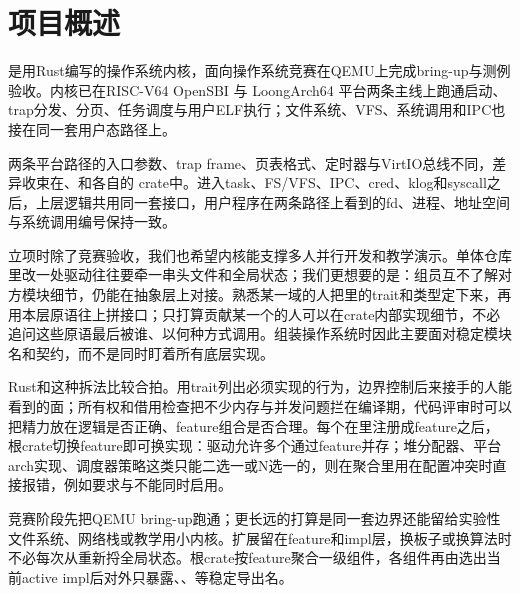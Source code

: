 %
%

\chapter{项目概述}

\wateros{}是用Rust编写的操作系统内核，面向操作系统竞赛在QEMU上完成bring-up与测例验收。内核已在RISC-V64 OpenSBI 与 LoongArch64  平台两条主线上跑通启动、trap分发、分页、任务调度与用户ELF执行；文件系统、VFS、系统调用和IPC也接在同一套用户态路径上。

两条平台路径的入口参数、trap frame、页表格式、定时器与VirtIO总线不同，差异收束在、和各自的 crate中。进入task、FS/VFS、IPC、cred、klog和syscall之后，上层逻辑共用同一套接口，用户程序在两条路径上看到的fd、进程、地址空间与系统调用编号保持一致。

立项时除了竞赛验收，我们也希望内核能支撑多人并行开发和教学演示。单体仓库里改一处驱动往往要牵一串头文件和全局状态；我们更想要的是：组员互不了解对方模块细节，仍能在抽象层上对接。熟悉某一域的人把里的trait和类型定下来，再用本层原语往上拼接口；只打算贡献某一个的人可以在crate内部实现细节，不必追问这些原语最后被谁、以何种方式调用。组装操作系统时因此主要面对稳定模块名和契约，而不是同时盯着所有底层实现。

Rust和这种拆法比较合拍。用trait列出必须实现的行为，边界控制后来接手的人能看到的面；所有权和借用检查把不少内存与并发问题拦在编译期，代码评审时可以把精力放在逻辑是否正确、feature组合是否合理。每个在里注册成feature之后，根crate切换feature即可换实现：驱动允许多个通过feature并存；堆分配器、平台arch实现、调度器策略这类只能二选一或N选一的，则在聚合里用在配置冲突时直接报错，例如要求与不能同时启用。

竞赛阶段先把QEMU bring-up跑通；更长远的打算是同一套边界还能留给实验性文件系统、网络栈或教学用小内核。扩展留在feature和impl层，换板子或换算法时不必每次从重新捋全局状态。根crate按feature聚合一级组件，各组件再由选出当前active impl后对外只暴露、、等稳定导出名。


